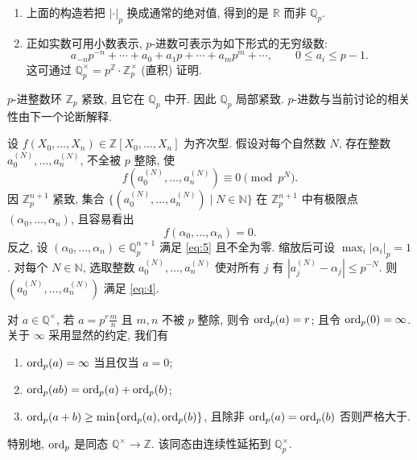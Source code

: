 \begin{remark} \label{thm:1.2.6} 
\begin{enumerate}[label=\textup{(\alph*)}]
\item 上面的构造若把 $|\cdot|_p$ 换成通常的绝对值, 得到的是 $\mathbb{R}$ 而非 $\mathbb{Q}_p$.
\item 正如实数可用小数表示, $p$-进数可表示为如下形式的无穷级数:
\[
a_{-n}p^{-n} + \cdots + a_0 + a_1p + \cdots + a_mp^m + \cdots, \qquad 0\le a_i\le p-1.
\]
这可通过 $\mathbb{Q}_p^{\times} = p^{\mathbb{Z}}\cdot\mathbb{Z}_p^{\times}$ (直积) 证明.
\end{enumerate}
$p$-进整数环 $\mathbb{Z}_p$ 紧致, 且它在 $\mathbb{Q}_p$ 中开. 因此 $\mathbb{Q}_p$ 局部紧致. $p$-进数与当前讨论的相关性由下一个论断解释.

设 $f(X_0,\dots,X_n)\in\mathbb{Z}[X_0,\dots,X_n]$ 为齐次型. 假设对每个自然数 $N$, 存在整数 $a_0^{(N)},\dots,a_n^{(N)}$, 不全被 $p$ 整除, 使
\begin{equation} \label{eq:4}
f(a_0^{(N)},\dots,a_n^{(N)}) \equiv 0 \pmod{p^N}.
\tag{4}
\end{equation}
因 $\mathbb{Z}_p^{n+1}$ 紧致, 集合 $\{(a_0^{(N)},\dots,a_n^{(N)}) \mid N\in\mathbb{N}\}$ 在 $\mathbb{Z}_p^{n+1}$ 中有极限点 $(\alpha_0,\dots,\alpha_n)$, 且容易看出
\begin{equation} \label{eq:5}
f(\alpha_0,\dots,\alpha_n) = 0.
\tag{5}
\end{equation}
反之, 设 $(\alpha_0,\dots,\alpha_n)\in\mathbb{Q}_p^{n+1}$ 满足 \eqref{eq:5} 且不全为零. 缩放后可设 $\max_i|\alpha_i|_p = 1$. 对每个 $N\in\mathbb{N}$, 选取整数 $a_0^{(N)},\dots,a_n^{(N)}$ 使对所有 $j$ 有 $|a_j^{(N)} - \alpha_j|\le p^{-N}$. 则 $(a_0^{(N)},\dots,a_n^{(N)})$ 满足 \eqref{eq:4}.
\end{remark}

\begin{notation} \label{thm:1.2.7}
对 $a\in\mathbb{Q}^{\times}$, 若 $a = p^r\frac{m}{n}$ 且 $m, n$ 不被 $p$ 整除, 则令 $\operatorname*{ord}\nolimits_p(a) = r$; 且令 $\operatorname*{ord}\nolimits_p(0) = \infty$. 关于 $\infty$ 采用显然的约定, 我们有
\begin{enumerate}[label=\textup{(\alph*)}]
\item $\operatorname*{ord}\nolimits_p(a) = \infty$ 当且仅当 $a = 0$;
\item $\operatorname*{ord}\nolimits_p(ab) = \operatorname*{ord}\nolimits_p(a) + \operatorname*{ord}\nolimits_p(b)$;
\item $\operatorname*{ord}\nolimits_p(a+b)\ge\min\{\operatorname*{ord}\nolimits_p(a),\operatorname*{ord}\nolimits_p(b)\}$, 且除非 $\operatorname*{ord}\nolimits_p(a) = \operatorname*{ord}\nolimits_p(b)$ 否则严格大于.
\end{enumerate}
特别地, $\operatorname*{ord}\nolimits_p$ 是同态 $\mathbb{Q}^{\times}\to\mathbb{Z}$. 该同态由连续性延拓到 $\mathbb{Q}_p^{\times}$.
\end{notation}

